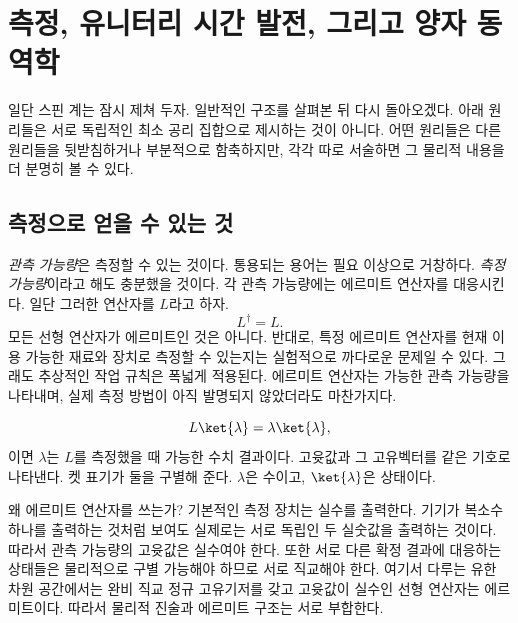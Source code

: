 \chapter{측정, 유니터리 시간 발전, 그리고 양자 동역학}


일단 스핀 계는 잠시 제쳐 두자. 일반적인 구조를 살펴본 뒤 다시 돌아오겠다. 아래 원리들은 서로 독립적인 최소 공리 집합으로 제시하는 것이 아니다. 어떤 원리들은 다른 원리들을 뒷받침하거나 부분적으로 함축하지만, 각각 따로 서술하면 그 물리적 내용을 더 분명히 볼 수 있다.

\section{측정으로 얻을 수 있는 것}

\emph{관측 가능량}은 측정할 수 있는 것이다. 통용되는 용어는 필요 이상으로 거창하다. \emph{측정 가능량}이라고 해도 충분했을 것이다. 각 관측 가능량에는 에르미트 연산자를 대응시킨다. 일단 그러한 연산자를 \(L\)라고 하자. \begin{equation}
L^\dagger=L.
\end{equation}모든 선형 연산자가 에르미트인 것은 아니다. 반대로, 특정 에르미트 연산자를 현재 이용 가능한 재료와 장치로 측정할 수 있는지는 실험적으로 까다로운 문제일 수 있다. 그래도 추상적인 작업 규칙은 폭넓게 적용된다. 에르미트 연산자는 가능한 관측 가능량을 나타내며, 실제 측정 방법이 아직 발명되지 않았더라도 마찬가지다.

\begin{equation}
L\ket{\lambda}=\lambda\ket{\lambda},
\end{equation}이면 \(\lambda\)는 \(L\)를 측정했을 때 가능한 수치 결과이다. 고윳값과 그 고유벡터를 같은 기호로 나타낸다. 켓 표기가 둘을 구별해 준다. \(\lambda\)은 수이고, \(\ket{\lambda}\)은 상태이다.

왜 에르미트 연산자를 쓰는가? 기본적인 측정 장치는 실수를 출력한다. 기기가 복소수 하나를 출력하는 것처럼 보여도 실제로는 서로 독립인 두 실숫값을 출력하는 것이다. 따라서 관측 가능량의 고윳값은 실수여야 한다. 또한 서로 다른 확정 결과에 대응하는 상태들은 물리적으로 구별 가능해야 하므로 서로 직교해야 한다. 여기서 다루는 유한 차원 공간에서는 완비 직교 정규 고유기저를 갖고 고윳값이 실수인 선형 연산자는 에르미트이다. 따라서 물리적 진술과 에르미트 구조는 서로 부합한다.

